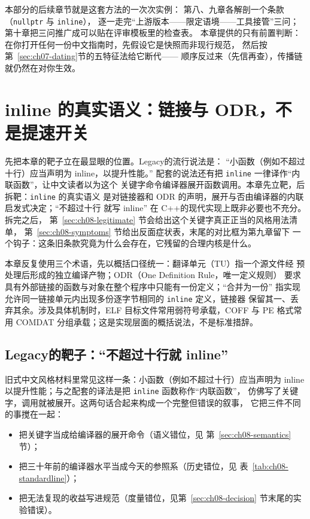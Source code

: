 \documentclass[12pt,a4paper,fontset=fandol]{ctexbook}
\newcommand{\Tp}[1]{\texttt{#1}}
\newcommand{\Lang}[1]{\textsf{#1}}
\newcommand{\CPP}{\Lang{C++}}
\newcommand{\DomTra}{\Lang{Legacy}}
\begin{document}
本部分的后续章节就是这套方法的一次次实例：
第八、九章各解剖一个条款（\Tp{nullptr} 与 \Tp{inline}），
逐一走完``上游版本——限定语境——工具接管''三问；
第十章把三问推广成可以贴在评审模板里的检查表。
本章提供的只有前置判断：
在你打开任何一份中文指南时，先假设它是快照而非现行规范，
然后按第~\ref{sec:ch07-dating}节的五特征法给它断代——
顺序反过来（先信再查），传播链就仍然在对你生效。


\chapter{inline 的真实语义：链接与 ODR，不是提速开关}
\label{ch:ch08-inline}

先把本章的靶子立在最显眼的位置。\DomTra 的流行说法是：
``小函数（例如不超过十行）应当声明为 inline，以提升性能。''
配套的说法还有把 \Tp{inline} 一律译作``内联函数''，让中文读者以为这个
关键字命令编译器展开函数调用。本章先立靶，后拆靶：\Tp{inline} 的真实语义
是对链接器和 ODR 的声明，展开与否由编译器的内联启发式决定；``不超过十行
就写 inline'' 在 \CPP 的现代实现上既非必要也不充分。拆完之后，
第~\ref{sec:ch08-legitimate} 节会给出这个关键字真正正当的风格用法清单，
第~\ref{sec:ch08-symptoms} 节给出反面症状表，末尾的对比框为第九章留下
一个钩子：这条旧条款究竟为什么会存在，它残留的合理内核是什么。

\begin{note}[title={术语概括：翻译单元、ODR、合并为一份}]
本章反复使用三个术语，先以概括口径统一：翻译单元（TU）指一个源文件经
预处理后形成的独立编译产物；ODR（One Definition Rule，唯一定义规则）
要求具有外部链接的函数与对象在整个程序中只能有一份定义；``合并为一份''
指实现允许同一链接单元内出现多份逐字节相同的 \Tp{inline} 定义，链接器
保留其一、丢弃其余。涉及具体机制时，ELF 目标文件常用弱符号承载，COFF
与 PE 格式常用 COMDAT 分组承载；这是实现层面的概括说法，不是标准措辞。
\end{note}

\section{\DomTra 的靶子：``不超过十行就 inline''}
\label{sec:ch08-target}

旧式中文风格材料里常见这样一条：小函数（例如不超过十行）应当声明为
inline 以提升性能；与之配套的译法是把 \Tp{inline} 函数称作``内联函数''，
仿佛写了关键字，调用就被展开。这两句话合起来构成一个完整但错误的叙事，
它把三件不同的事搅在一起：
\begin{itemize}
  \item 把关键字当成给编译器的展开命令（语义错位，见
        第~\ref{sec:ch08-semantics} 节）；
  \item 把三十年前的编译器水平当成今天的参照系（历史错位，见
        表~\ref{tab:ch08-standardline}）；
  \item 把无法复现的收益写进规范（度量错位，见第~\ref{sec:ch08-decision}
        节末尾的实验错误）。
\end{itemize}
\end{document}
